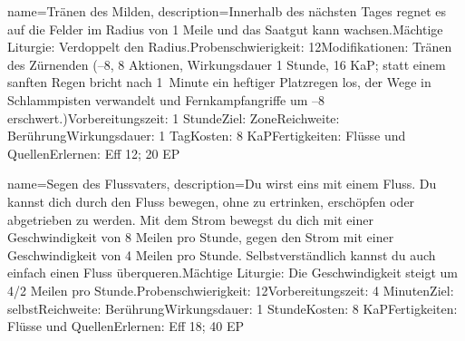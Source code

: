 {
    name={Tränen des Milden},
    description={Innerhalb des nächsten Tages regnet es auf die Felder im Radius von 1 Meile und das Saatgut kann wachsen.\newline Mächtige Liturgie: Verdoppelt den Radius.\newline Probenschwierigkeit: 12\newline Modifikationen: Tränen des Zürnenden (–8, 8 Aktionen, Wirkungsdauer 1 Stunde, 16 KaP; statt einem sanften Regen bricht nach 1 Minute ein heftiger Platzregen los, der Wege in Schlammpisten verwandelt und Fernkampfangriffe um –8 erschwert.)\newline Vorbereitungszeit: 1 Stunde\newline Ziel: Zone\newline Reichweite: Berührung\newline Wirkungsdauer: 1 Tag\newline Kosten: 8 KaP\newline Fertigkeiten: Flüsse und Quellen\newline Erlernen: Eff 12; 20 EP}
}


{
    name={Segen des Flussvaters},
    description={Du wirst eins mit einem Fluss. Du kannst dich durch den Fluss bewegen, ohne zu ertrinken, erschöpfen oder abgetrieben zu werden. Mit dem Strom bewegst du dich mit einer Geschwindigkeit von 8 Meilen pro Stunde, gegen den Strom mit einer Geschwindigkeit von 4 Meilen pro Stunde. Selbstverständlich kannst du auch einfach einen Fluss überqueren.\newline Mächtige Liturgie: Die Geschwindigkeit steigt um 4/2 Meilen pro Stunde.\newline Probenschwierigkeit: 12\newline Vorbereitungszeit: 4 Minuten\newline Ziel: selbst\newline Reichweite: Berührung\newline Wirkungsdauer: 1 Stunde\newline Kosten: 8 KaP\newline Fertigkeiten: Flüsse und Quellen\newline Erlernen: Eff 18; 40 EP}
}


